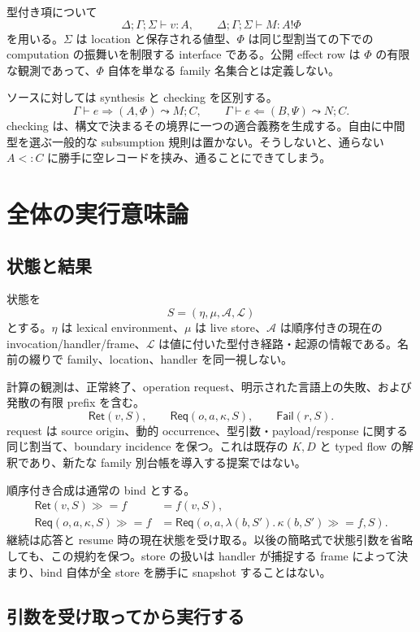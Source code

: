 \documentclass[11pt,a4paper]{article}
\theoremstyle{remark}
\newcommand{\Ret}{\mathsf{Ret}}
\newcommand{\Req}{\mathsf{Req}}
\newcommand{\bind}{\mathbin{\gg\!=}}
\begin{document}
型付き項について
\[
\Delta;\Gamma;\Sigma\vdash v:A,
\qquad
\Delta;\Gamma;\Sigma\vdash M:A\mathbin{!}\Phi
\]
を用いる。$\Sigma$ は location と保存される値型、$\Phi$ は同じ型割当ての下での computation の振舞いを制限する interface である。公開 effect row は $\Phi$ の有限な観測であって、$\Phi$ 自体を単なる family 名集合とは定義しない。

ソースに対しては synthesis と checking を区別する。
\[
\Gamma\vdash e\Rightarrow(A,\Phi)\leadsto M;C,
\qquad
\Gamma\vdash e\Leftarrow(B,\Psi)\leadsto N;C.
\]
checking は、構文で決まるその境界に一つの適合義務を生成する。自由に中間型を選ぶ一般的な subsumption 規則は置かない。そうしないと、通らない $A<:C$ に勝手に空レコードを挟み、通ることにできてしまう。

\section{全体の実行意味論}

\subsection{状態と結果}

状態を
\[
S=(\eta,\mu,\mathcal A,\mathcal L)
\]
とする。$\eta$ は lexical environment、$\mu$ は live store、$\mathcal A$ は順序付きの現在の invocation/handler/frame、$\mathcal L$ は値に付いた型付き経路・起源の情報である。名前の綴りで family、location、handler を同一視しない。

計算の観測は、正常終了、operation request、明示された言語上の失敗、および発散の有限 prefix を含む。
\[
\Ret(v,S),\qquad \Req(o,a,\kappa,S),\qquad
\mathsf{Fail}(r,S).
\]
request は source origin、動的 occurrence、型引数・payload/response に関する同じ割当て、boundary incidence を保つ。これは既存の $K,D$ と typed flow の解釈であり、新たな family 別台帳を導入する提案ではない。

順序付き合成は通常の bind とする。
\[
\begin{aligned}
\Ret(v,S)\bind f&=f(v,S),\\
\Req(o,a,\kappa,S)\bind f
 &=\Req(o,a,\lambda(b,S').\,\kappa(b,S')\bind f,S).
\end{aligned}
\]
継続は応答と resume 時の現在状態を受け取る。以後の簡略式で状態引数を省略しても、この規約を保つ。store の扱いは handler が捕捉する frame によって決まり、bind 自体が全 store を勝手に snapshot することはない。

\subsection{引数を受け取ってから実行する}
\end{document}

